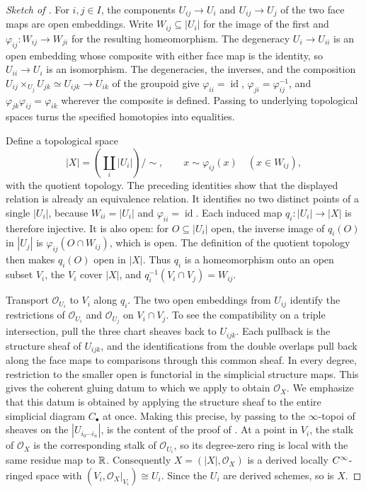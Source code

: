 \begin{proof}[Sketch of ]
For $i,j\in I$, the components $U_{ij}\to U_i$ and $U_{ij}\to U_j$ of
the two face maps are open embeddings. Write $W_{ij}\subseteq|U_i|$ for
the image of the first and $\varphi_{ij}\colon W_{ij}\to W_{ji}$ for the
resulting homeomorphism. The degeneracy $U_i\to U_{ii}$ is an open
embedding whose composite with either face map is the identity, so
$U_{ii}\to U_i$ is an isomorphism. The degeneracies, the inverses, and
the composition $U_{ij}\times_{U_j}U_{jk}\simeq U_{ijk}\to U_{ik}$ of the
groupoid give $\varphi_{ii}=\operatorname{id}$,
$\varphi_{ji}=\varphi_{ij}^{-1}$, and
$\varphi_{jk}\varphi_{ij}=\varphi_{ik}$ wherever the composite is
defined. Passing to underlying topological spaces turns the specified
homotopies into equalities.

Define a topological space
\[
 |X|=\left(\coprod_i|U_i|\right)\big/\sim,
 \qquad
 x\sim\varphi_{ij}(x)\quad(x\in W_{ij}),
\]
with the quotient topology. The preceding identities show that the
displayed relation is already an equivalence relation. It identifies
no two distinct points of a single $|U_i|$, because $W_{ii}=|U_i|$
and $\varphi_{ii}=\operatorname{id}$. Each induced map
$q_i\colon|U_i|\to|X|$ is therefore injective.
It is also open: for $O\subseteq|U_i|$ open, the inverse image
of $q_i(O)$ in $|U_j|$ is
$\varphi_{ij}(O\cap W_{ij})$, which is open. The definition of
the quotient topology then makes $q_i(O)$ open in $|X|$.
Thus $q_i$ is a homeomorphism onto an open subset $V_i$, the
$V_i$ cover $|X|$, and $q_i^{-1}(V_i\cap V_j)=W_{ij}$.

Transport $\mathcal O_{U_i}$ to $V_i$ along $q_i$.
The two open embeddings from $U_{ij}$ identify the restrictions
of $\mathcal O_{U_i}$ and $\mathcal O_{U_j}$ on $V_i\cap V_j$.
To see the compatibility on a triple intersection, pull the three
chart sheaves back to $U_{ijk}$. Each pullback is the structure sheaf of
$U_{ijk}$, and the identifications from the double overlaps pull back
along the face maps to comparisons through this common sheaf. In every
degree, restriction to the smaller open is functorial in the simplicial
structure maps. This gives the coherent gluing datum to which we apply
 to obtain $\mathcal O_X$.
We emphasize that this datum is obtained by applying the structure
sheaf to the entire simplicial diagram $C_\bullet$ at once. Making this
precise, by passing to the $\infty$-topoi of sheaves on the
$|U_{i_0\cdots i_n}|$, is the content of the proof of
\citet[Proposition~2.1.18]{Steffens_Representability_Elliptic_Moduli}.
At a point in $V_i$, the stalk of $\mathcal O_X$ is the corresponding
stalk of $\mathcal O_{U_i}$, so its degree-zero ring is local with the
same residue map to $\mathbb{R}$. Consequently
$X=(|X|,\mathcal O_X)$ is a derived locally $C^\infty$-ringed space with
$(V_i,\mathcal O_X|_{V_i})\cong U_i$. Since the $U_i$ are derived schemes,
so is $X$.


\end{proof}
